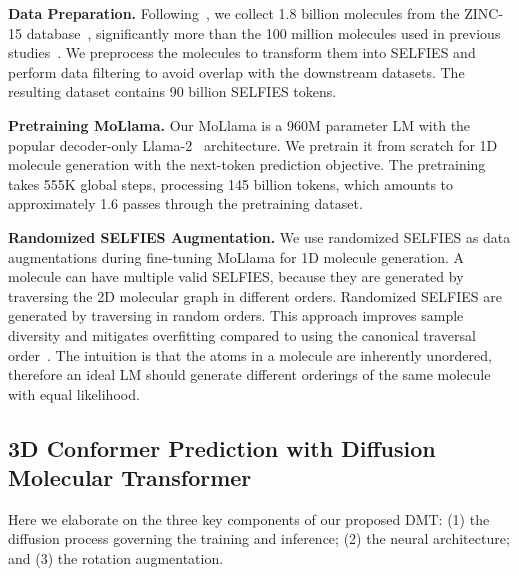 \textbf{Data Preparation.} Following~\citep{Chemformer}, we collect 1.8 billion molecules from the ZINC-15 database~\citep{ZINC15}, significantly more than the 100 million molecules used in previous studies~\citep{Chemformer,MolGen}. We preprocess the molecules to transform them into SELFIES and perform data filtering to avoid overlap with the downstream datasets. The resulting dataset contains 90 billion SELFIES tokens. 



\textbf{Pretraining MoLlama.} Our MoLlama is a 960M parameter LM with the popular decoder-only Llama-2~\citep{Llama-2} architecture. We pretrain it from scratch for 1D molecule generation with the next-token prediction objective. The pretraining takes 555K global steps, processing 145 billion tokens, which amounts to approximately 1.6 passes through the pretraining dataset.


\textbf{Randomized SELFIES Augmentation.} We use randomized SELFIES as data augmentations during fine-tuning MoLlama for 1D molecule generation. A molecule can have multiple valid SELFIES, because they are generated by traversing the 2D molecular graph in different orders. Randomized SELFIES are generated by traversing in random orders. This approach improves sample diversity and mitigates overfitting compared to using the canonical traversal order~\citep{RandomSmiles}. The intuition is that the atoms in a molecule are inherently unordered, therefore an ideal LM should generate different orderings of the same molecule with equal likelihood. 



\vspace{-1mm}
\subsection{3D Conformer Prediction with Diffusion Molecular Transformer}
\vspace{-1mm}
Here we elaborate on the three key components of our proposed DMT: (1) the diffusion process governing the training and inference; (2) the neural architecture; and (3) the rotation augmentation. 

